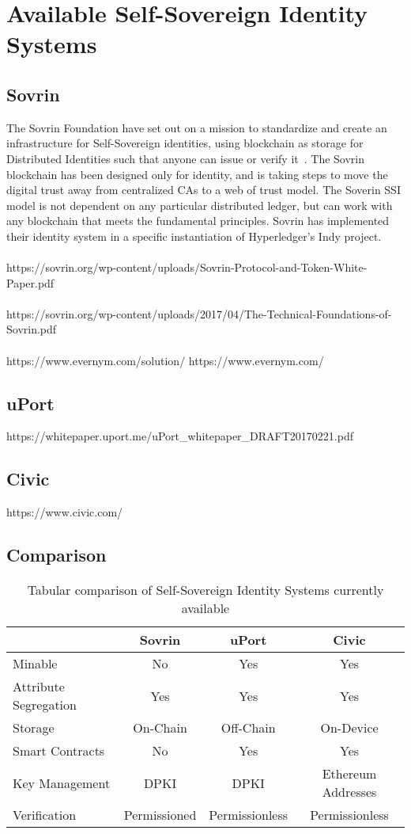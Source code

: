 \section{Available Self-Sovereign Identity Systems}
\label{sec:ssi_systems}
\subsection{Sovrin}
The Sovrin Foundation have set out on a mission to standardize and create an infrastructure for Self-Sovereign identities, using blockchain as storage for Distributed Identities such that anyone can issue or verify it~\cite{sovrin}. The Sovrin blockchain has been designed only for identity, and is taking steps to move the digital trust away from centralized CAs to a web of trust model. The Soverin SSI model is not dependent on any particular distributed ledger, but can work with any blockchain that meets the fundamental principles. Sovrin has implemented their identity system in a specific instantiation of Hyperledger's Indy project.
\\\\
https://sovrin.org/wp-content/uploads/Sovrin-Protocol-and-Token-White-Paper.pdf
\\\\ https://sovrin.org/wp-content/uploads/2017/04/The-Technical-Foundations-of-Sovrin.pdf
\\\\
https://www.evernym.com/solution/
https://www.evernym.com/

\subsection{uPort}
https://whitepaper.uport.me/uPort\_whitepaper\_DRAFT20170221.pdf


\subsection{Civic}
https://www.civic.com/

\subsection{Comparison}
\begin{table}[ht]
\begin{center}
\begin{tabular}{|l|c|c|c|}
\hline
 & Sovrin & uPort & Civic \\
\hline
Minable & No & Yes & Yes  \\
Attribute Segregation & Yes & Yes & Yes \\
Storage & On-Chain & Off-Chain & On-Device \\
Smart Contracts & No & Yes & Yes \\
Key Management & DPKI & DPKI & Ethereum Addresses \\
Verification & Permissioned & Permissionless & Permissionless  \\
\hline
\end{tabular}
\caption[Comparison of SSI Systems]{Tabular comparison of Self-Sovereign Identity Systems currently available}
\label{tbl:SSIS}
\end{center}
\end{table}